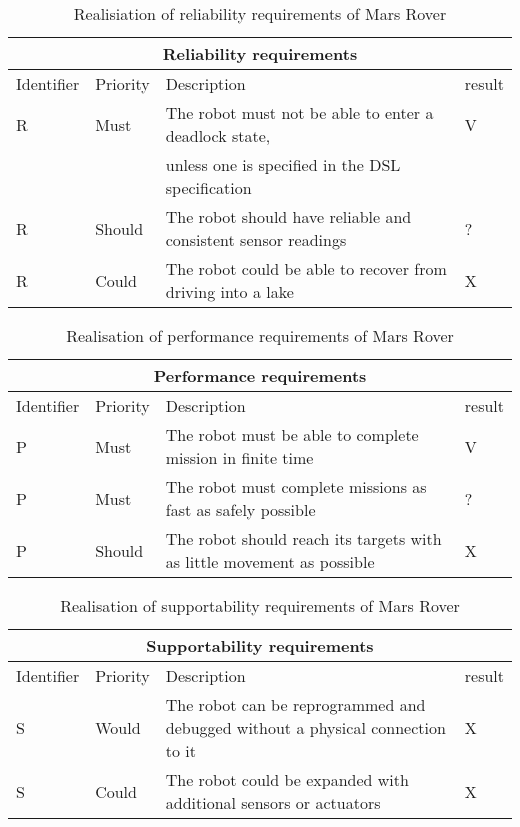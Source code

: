 \setcounter{TCC}{1}
\begin{table}[H]
	\centering
	\begin{tabular}{|l|l|l|l|}
		\hline
		\multicolumn{4}{|c|}{Reliability requirements} \\  \hline
		\hline
		Identifier & Priority & Description & result \\  
		\hline
		\hline
		R\doTCC & Must & The robot must not be able to enter a deadlock state,
			& V\\  
				& 		& unless one is specified in the DSL specification 
			& \\  \hline
		R\doTCC & Should & The robot should have reliable and consistent 
			sensor readings & ?\\  \hline
		R\doTCC & Could & The robot could be able to recover from driving into
			a lake & X\\  
		\hline
	\end{tabular}
\caption{Realisiation of reliability requirements of Mars Rover}
\label{tbl:endReliabilityReq}
\end{table}

\setcounter{TCC}{1}
\begin{table}[H]
	\centering
	\begin{tabular}{|l|l|l|l|}
		\hline
		\multicolumn{4}{|c|}{Performance requirements} \\  \hline
		\hline
		Identifier & Priority & Description & result \\  
		\hline
		\hline
		P\doTCC & Must & The robot must be able to complete mission in finite 
			time & V \\  \hline
		P\doTCC & Must & The robot must complete missions as fast as safely 
			possible & ? \\   \hline
		P\doTCC & Should & The robot should reach its targets with as little 
			movement as possible & X \\  
		\hline
	\end{tabular}
\caption{Realisation of performance requirements of Mars Rover}
\label{tbl:endPerformanceReq}
\end{table}

\setcounter{TCC}{1}
\begin{table}[H]
	\centering
	\begin{tabular}{|l|l|l|l|}
		\hline
		\multicolumn{4}{|c|}{Supportability requirements} \\  \hline
		\hline
		Identifier & Priority & Description & result\\  
		\hline
		\hline
		S\doTCC & Would & The robot can be reprogrammed and debugged without
			a physical connection to it & X\\  \hline
		S\doTCC & Could & The robot could be expanded with additional sensors
			or actuators & X\\  
		\hline
	\end{tabular}
\caption{Realisation of supportability requirements of Mars Rover}
\label{tbl:endSupportabilityReq}
\end{table}

